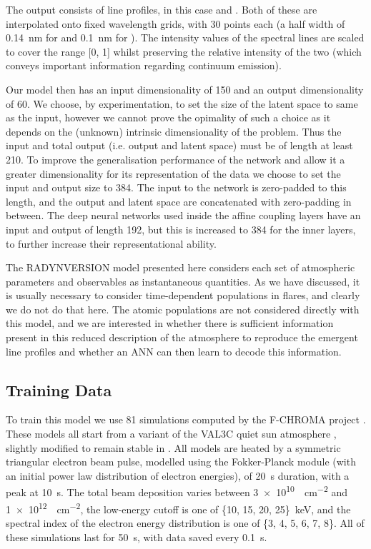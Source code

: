 The output consists of line profiles, in this case \Ha{} and \CaLine{}.
Both of these are interpolated onto fixed wavelength grids, with 30 points each (a half width of \SI{0.14}{\nano\metre} for \Ha{} and \SI{0.1}{\nano\metre} for \CaLine{}).
The intensity values of the spectral lines are scaled to cover the range [0, 1] whilst preserving the relative intensity of the two (which conveys important information regarding continuum emission).

Our model then has an input dimensionality of 150 and an output dimensionality of 60.
We choose, by experimentation, to set the size of the latent space to same as the input, however we cannot prove the opimality of such a choice as it depends on the (unknown) intrinsic dimensionality of the problem.
Thus the input and total output (i.e. output and latent space) must be of length at least 210.
To improve the generalisation performance of the network and allow it a greater dimensionality for its representation of the data we choose to set the input and output size to 384.
The input to the network is zero-padded to this length, and the output and latent space are concatenated with zero-padding in between.
The deep neural networks used inside the affine coupling layers have an input and output of length 192, but this is increased to 384 for the inner layers, to further increase their representational ability.

The RADYNVERSION model presented here considers each set of atmospheric parameters and observables as instantaneous quantities.
As we have discussed, it is usually necessary to consider time-dependent populations in flares, and clearly we do not do that here.
The atomic populations are not considered directly with this model, and we are interested in whether there is sufficient information present in this reduced description of the atmosphere to reproduce the emergent line profiles and whether an ANN can then learn to decode this information.

\subsection{Training Data}

To train this model we use 81 \Radyn{} simulations computed by the F-CHROMA project \NeedRef{}.
These models all start from a variant of the VAL3C quiet sun atmosphere \citep{Vernazza1981}, slightly modified to remain stable in \Radyn{}.
All models are heated by a symmetric triangular electron beam pulse, modelled using the Fokker-Planck module (with an initial power law distribution of electron energies), of \SI{20}{\s} duration, with a peak at \SI{10}{\s}.
The total beam deposition varies between \SI{3e10}{\erg\per\square\cm} and \SI{1e12}{\erg\per\square\cm}, the low-energy cutoff is one of \{10, 15, 20, 25\}~\si{\kilo\electronvolt}, and the spectral index of the electron energy distribution is one of \{3, 4, 5, 6, 7, 8\}.
All of these simulations last for \SI{50}{\s}, with data saved every \SI{0.1}{\s}.

